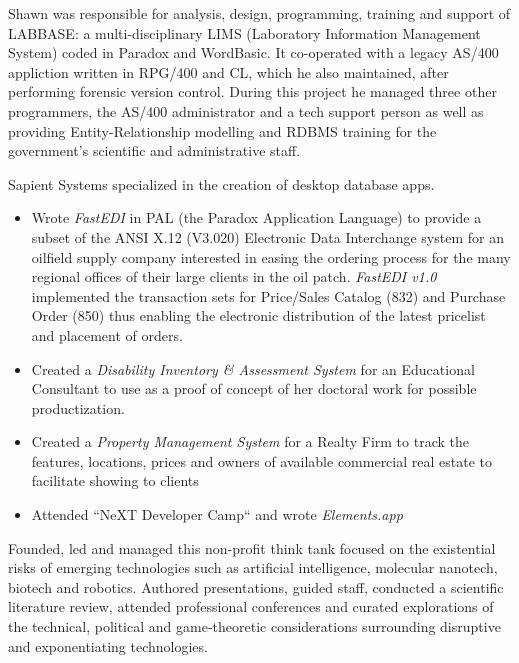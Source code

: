 \documentclass[line,margin,hidelinks]{res}
\begin{document}
\begin{resume}
\begin{position}
\begin{itemize}
\end{itemize}

\end{position}


\begin{position}
  Shawn was responsible for analysis, design, programming,
  training and support of LABBASE: a multi-disciplinary LIMS
  (Laboratory Information Management System) coded in Paradox and
  WordBasic.  It co-operated with a legacy AS/400 appliction written
  in RPG/400 and CL, which he also maintained, after performing
  forensic version control.  During this project he
  managed three other programmers, the AS/400 administrator and a tech
  support person as well as providing Entity-Relationship modelling and
  RDBMS training for the government's scientific and administrative
  staff.
\end{position}


\begin{position}
Sapient Systems specialized in the creation of desktop database apps.
\begin{itemize}
\item Wrote {\it FastEDI} in PAL (the Paradox Application Language)  to
	provide a subset of the
	ANSI X.12 (V3.020) Electronic Data Interchange system for an
	oilfield supply company interested in easing the ordering process for
	the many regional offices of their large clients in the oil patch.
	{\it FastEDI v1.0} implemented
	the transaction sets for Price/Sales Catalog (832) and
	Purchase Order (850) thus enabling the electronic distribution
	of the latest pricelist and placement of orders.
\item Created a {\it Disability Inventory \& Assessment System }
	for an Educational Consultant to use as a proof of concept of
	her doctoral work for possible productization.
\item Created a {\it Property Management System} for a Realty Firm to
	track the features, locations, prices and owners of
	available commercial real estate to facilitate showing to clients
\item Attended ``NeXT Developer Camp`` and wrote \emph{Elements.app}
\end{itemize}
\end{position}


\begin{position}
  Founded, led and managed this non-profit think tank focused on the existential
  risks of emerging technologies such as artificial intelligence, molecular
  nanotech, biotech and robotics.
  Authored presentations, guided staff, conducted a scientific literature review,
  attended professional conferences and curated explorations of the technical, political
  and game-theoretic considerations surrounding disruptive and exponentiating technologies.
\end{position}


\end{resume}
\end{document}
